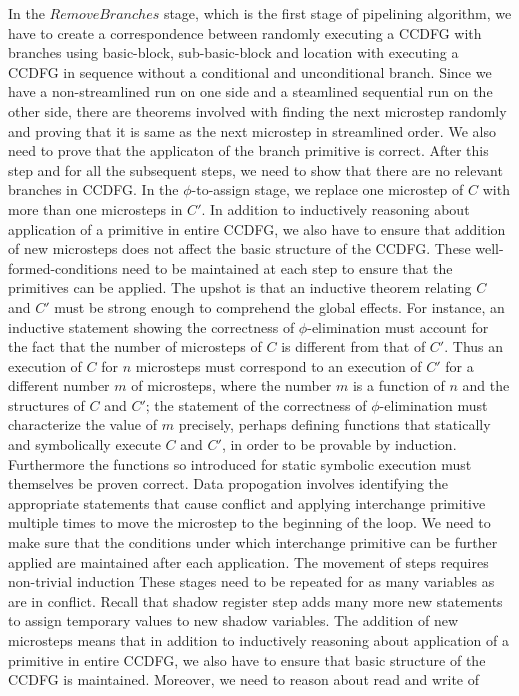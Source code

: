 In the $Remove Branches$ stage, which is the first stage of pipelining algorithm, we have to create a correspondence between randomly executing a CCDFG with branches using basic-block, sub-basic-block and location with executing a CCDFG in sequence without a conditional and unconditional branch. Since we have a non-streamlined run on one side and a steamlined sequential run on the other side, there are theorems involved with finding the next microstep randomly and proving that it is same as the next microstep in streamlined order. We also need to prove that the applicaton of the branch primitive is correct. After this step and for all the subsequent steps, we need to show that there are no relevant branches in CCDFG. In the $\phi$-to-assign stage, we replace one microstep of $C$ with more than one microsteps in $C'$. In addition to inductively reasoning about application of a primitive in entire CCDFG, we also have to ensure
that addition of new microsteps does not affect the basic structure of the CCDFG. These well-formed-conditions need to be maintained at each step to ensure that the primitives can be applied. The upshot is that an inductive theorem relating $C$ and $C'$ must be strong enough to 
comprehend the global effects. For instance, an inductive statement showing the correctness of $\phi$-elimination must account for the fact
that the number of microsteps of $C$ is different from that
of $C'$.  Thus an execution of $C$ for $n$ microsteps must
correspond to an execution of $C'$ for a different number
$m$ of microsteps, where the number $m$ is a function of $n$
and the structures of $C$ and $C'$; the statement of the
correctness of $\phi$-elimination must characterize the
value of $m$ precisely, perhaps defining functions that
statically and symbolically execute $C$ and $C'$, in order
to be provable by induction.  Furthermore the functions so
introduced for static symbolic execution must themselves be
proven correct. Data propogation involves identifying 
the appropriate statements that cause conflict and applying interchange primitive multiple times 
to move the microstep to the beginning of the loop. We need to make sure that the conditions under which
interchange primitive can be further applied are maintained after each application. The movement of steps requires non-trivial induction These stages need to be
repeated for as many variables as are in conflict. 
Recall that shadow register step adds many more new statements to assign temporary values to 
new shadow variables. The addition of new microsteps means that in addition to inductively reasoning about application of a primitive in entire CCDFG, we also have to ensure that basic structure of the CCDFG is maintained. Moreover, we need to reason about read and write of 
